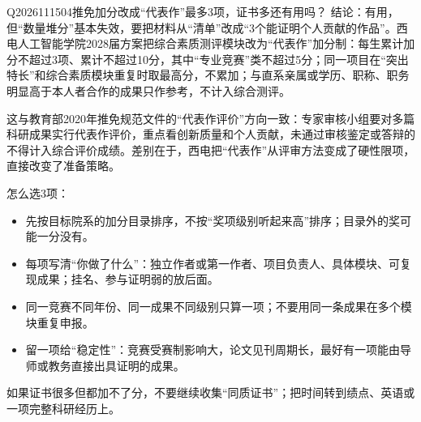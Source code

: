 \begin{qa}{Q2026111504}{推免加分改成“代表作”最多3项，证书多还有用吗？}
结论：有用，但“数量堆分”基本失效，要把材料从“清单”改成“3个能证明个人贡献的作品”。西电人工智能学院2028届方案把综合素质测评模块改为“代表作”加分制：每生累计加分不超过3项、累计不超过10分，其中“专业竞赛”类不超过5分；同一项目在“突出特长”和综合素质模块重复时取最高分，不累加；与直系亲属或学历、职称、职务明显高于本人者合作的成果只作参考，不计入综合测评。

这与教育部2020年推免规范文件的“代表作评价”方向一致：专家审核小组要对多篇科研成果实行代表作评价，重点看创新质量和个人贡献，未通过审核鉴定或答辩的不得计入综合评价成绩。差别在于，西电把“代表作”从评审方法变成了硬性限项，直接改变了准备策略。

怎么选3项：

\begin{itemize}
\item 先按目标院系的加分目录排序，不按“奖项级别听起来高”排序；目录外的奖可能一分没有。
\item 每项写清“你做了什么”：独立作者或第一作者、项目负责人、具体模块、可复现成果；挂名、参与证明弱的放后面。
\item 同一竞赛不同年份、同一成果不同级别只算一项；不要用同一条成果在多个模块重复申报。
\item 留一项给“稳定性”：竞赛受赛制影响大，论文见刊周期长，最好有一项能由导师或教务直接出具证明的成果。
\end{itemize}

如果证书很多但都加不了分，不要继续收集“同质证书”；把时间转到绩点、英语或一项完整科研经历上。
\end{qa}

